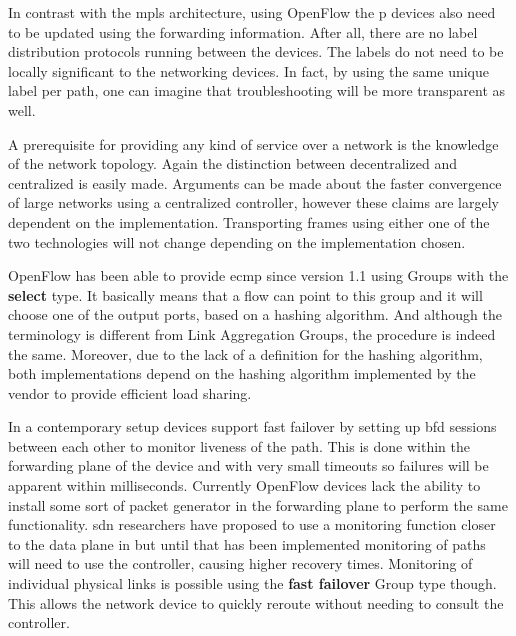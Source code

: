 In contrast with the \ac{mpls} architecture, using OpenFlow the \ac{p} devices also need to be updated using the forwarding information. After all, there are no label distribution protocols running between the devices. The labels do not need to be locally significant to the networking devices. In fact, by using the same unique label per path, one can imagine that troubleshooting will be more transparent as well.



A prerequisite for providing any kind of service over a network is the knowledge of the network topology. Again the distinction between decentralized and centralized is easily made. Arguments can be made about the faster convergence of large networks using a centralized controller, however these claims are largely dependent on the implementation. Transporting frames using either one of the two technologies will not change depending on the implementation chosen.

OpenFlow has been able to provide \ac{ecmp} since version 1.1 using Groups with the \textbf{select} type. It basically means that a flow can point to this group and it will choose one of the output ports, based on a hashing algorithm. And although the terminology is different from Link Aggregation Groups, the procedure is indeed the same. Moreover, due to the lack of a definition for the hashing algorithm, both implementations depend on the hashing algorithm implemented by the vendor to provide efficient load sharing.

In a contemporary setup devices support fast failover by setting up \ac{bfd} sessions between each other to monitor liveness of the path. This is done within the forwarding plane of the device and with very small timeouts so failures will be apparent within milliseconds. Currently OpenFlow devices lack the ability to install some sort of packet generator in the forwarding plane to perform the same functionality. \ac{sdn} researchers have proposed to use a monitoring function closer to the data plane in \cite{scalable-fault} but until that has been implemented monitoring of paths will need to use the controller, causing higher recovery times. Monitoring of individual physical links is possible using the \textbf{fast failover} Group type though. This allows the network device to quickly reroute without needing to consult the controller.

